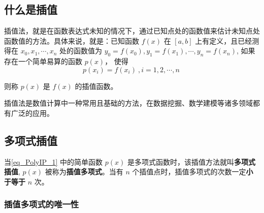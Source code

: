 \subsection{什么是插值}
插值法，就是在函数表达式未知的情况下，通过已知点处的函数值来估计未知点处函数值的方法。具体来说，就是：已知函数 $f(x)$ 在 $\left[a,b\right] $ 上有定义，且已经测得在 $x_0,x_1,\cdots, x_n$ 处的函数值为 $y_0 = f(x_0),y_1 = f(x_1), \cdots, y_n = f(x_n)$, 如果存在一个简单易算的函数 $p(x)$， 使得\begin{equation}
\label{eq_PolyIP_1}
p(x_i) = f(x_i)~, i = 1,2, \cdots, n~
\end{equation}

则称 $p(x)$ 是 $f(x)$ 的插值函数。

插值法是数值计算中一种常用且基础的方法，在数据挖掘、数学建模等诸多领域都有广泛的应用。

\subsection{多项式插值}
当\autoref{eq_PolyIP_1} 中的简单函数 $p(x)$ 是多项式函数时，该插值方法就叫\textbf{多项式插值}, $p(x)$ 被称为\textbf{插值多项式}。当有 $n$ 个插值点时，插值多项式的次数一定\textbf{小于等于} $n$ 次。
\subsubsection{插值多项式的唯一性}
